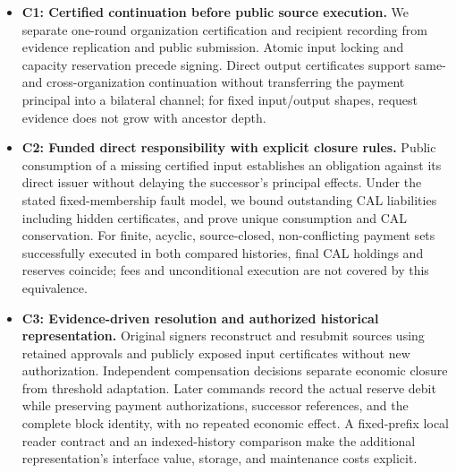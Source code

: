\begin{itemize}
\item \textbf{C1: Certified continuation before public source execution.}
We separate one-round organization certification and recipient recording
from evidence replication and public submission. Atomic input locking
and capacity reservation precede signing. Direct output certificates
support same- and cross-organization continuation without transferring
the payment principal into a bilateral channel; for fixed input/output
shapes, request evidence does not grow with ancestor depth.

\item \textbf{C2: Funded direct responsibility with explicit closure rules.}
Public consumption of a missing certified input establishes an obligation
against its direct issuer without delaying the successor's principal
effects. Under the stated fixed-membership fault model, we bound
outstanding CAL liabilities including hidden certificates, and prove
unique consumption and CAL conservation. For finite, acyclic,
source-closed, non-conflicting payment sets successfully executed in
both compared histories, final CAL holdings and reserves coincide;
fees and unconditional execution are not covered by this equivalence.

\item \textbf{C3: Evidence-driven resolution and authorized historical
representation.}
Original signers reconstruct and resubmit sources using retained
approvals and publicly exposed input certificates without new authorization.
Independent
compensation decisions separate economic closure from threshold
adaptation. Later commands record the actual reserve debit while
preserving payment authorizations, successor references, and the complete
block identity, with no repeated economic effect. A fixed-prefix local
reader contract and an indexed-history comparison make the additional
representation's interface value, storage, and maintenance costs explicit.
\end{itemize}